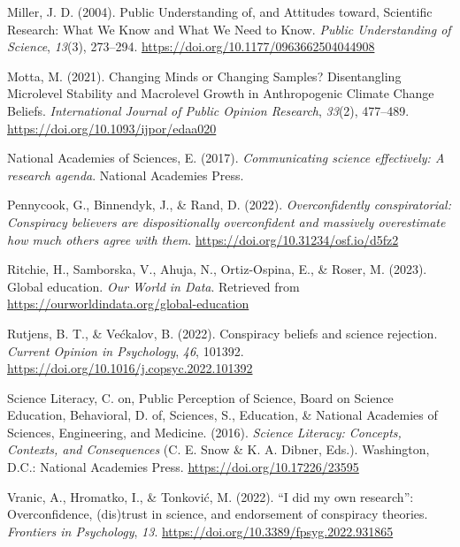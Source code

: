 \documentclass[
  doc,floatsintext]{apa6}
\newlength{\cslhangindent}
\newenvironment{CSLReferences}[2] %
 {\begin{list}{}{%
  \setlength{\itemindent}{0pt}
  \setlength{\leftmargin}{0pt}
  \setlength{\parsep}{0pt}
  \ifodd #1
   \setlength{\leftmargin}{\cslhangindent}
   \setlength{\itemindent}{-1\cslhangindent}
  \fi
  \setlength{\itemsep}{#2\baselineskip}}}
 {\end{list}}
\begin{document}
\begin{CSLReferences}{1}{0}
Miller, J. D. (2004). Public Understanding of, and Attitudes toward, Scientific Research: What We Know and What We Need to Know. \emph{Public Understanding of Science}, \emph{13}(3), 273--294. \url{https://doi.org/10.1177/0963662504044908}

Motta, M. (2021). Changing Minds or Changing Samples? Disentangling Microlevel Stability and Macrolevel Growth in Anthropogenic Climate Change Beliefs. \emph{International Journal of Public Opinion Research}, \emph{33}(2), 477--489. \url{https://doi.org/10.1093/ijpor/edaa020}

National Academies of Sciences, E. (2017). \emph{Communicating science effectively: A research agenda}. National Academies Press.

Pennycook, G., Binnendyk, J., \& Rand, D. (2022). \emph{Overconfidently conspiratorial: Conspiracy believers are dispositionally overconfident and massively overestimate how much others agree with them}. \url{https://doi.org/10.31234/osf.io/d5fz2}

Ritchie, H., Samborska, V., Ahuja, N., Ortiz-Ospina, E., \& Roser, M. (2023). Global education. \emph{Our World in Data}. Retrieved from \url{https://ourworldindata.org/global-education}

Rutjens, B. T., \& Većkalov, B. (2022). Conspiracy beliefs and science rejection. \emph{Current Opinion in Psychology}, \emph{46}, 101392. \url{https://doi.org/10.1016/j.copsyc.2022.101392}

Science Literacy, C. on, Public Perception of Science, Board on Science Education, Behavioral, D. of, Sciences, S., Education, \& National Academies of Sciences, Engineering, and Medicine. (2016). \emph{Science Literacy: Concepts, Contexts, and Consequences} (C. E. Snow \& K. A. Dibner, Eds.). Washington, D.C.: National Academies Press. \url{https://doi.org/10.17226/23595}

Vranic, A., Hromatko, I., \& Tonković, M. (2022). {``}I did my own research{''}: Overconfidence, (dis)trust in science, and endorsement of conspiracy theories. \emph{Frontiers in Psychology}, \emph{13}. \url{https://doi.org/10.3389/fpsyg.2022.931865}


\end{CSLReferences}
\end{document}
